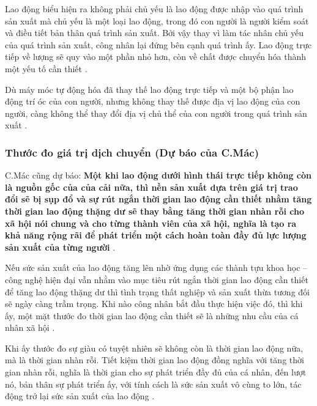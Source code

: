 Lao động biểu hiện ra không phải chủ yếu là lao động được nhập vào quá trình sản xuất mà chủ yếu là một loại lao động, trong đó con người là người kiểm soát và điều tiết bản thân quá trình sản xuất. Bởi vậy thay vì làm tác nhân chủ yếu của quá trình sản xuất, công nhân lại đứng bên cạnh quá trình ấy. Lao động trực tiếp về lượng sẽ quy vào một phần nhỏ hơn, còn về chất được chuyển hóa thành một yếu tố cần thiết \cite{do_the_tung_gttd, marx_toantp_t46p2}.

Dù máy móc tự động hóa đã thay thế lao động trực tiếp và một bộ phận lao động trí óc của con người, nhưng không thay thế được địa vị lao động của con người, càng không thể thay đổi địa vị chủ thể của con người trong quá trình sản xuất \cite{tran_hieu_gttd}.

\subsubsection{Thước đo giá trị dịch chuyển (Dự báo của C.Mác)}

C.Mác cũng dự báo: \textbf{Một khi lao động dưới hình thái trực tiếp không còn là nguồn gốc của của cải nữa, thì nền sản xuất dựa trên giá trị trao đổi sẽ bị sụp đổ và sự rút ngắn thời gian lao động cần thiết nhằm tăng thời gian lao động thặng dư sẽ thay bằng tăng thời gian nhàn rỗi cho xã hội nói chung và cho từng thành viên của xã hội, nghĩa là tạo ra khả năng rộng rãi để phát triển một cách hoàn toàn đầy đủ lực lượng sản xuất của từng người} \cite{do_the_tung_gttd, marx_toantp_t46p2_b}.

Nếu sức sản xuất của lao động tăng lên nhờ ứng dụng các thành tựu khoa học -- công nghệ hiện đại vẫn nhằm vào mục tiêu rút ngắn thời gian lao động cần thiết để tăng lao động thặng dư thì tình trạng thất nghiệp và sản xuất thừa tương đối sẽ ngày càng trầm trọng. Khi nào công nhân bắt đầu thực hiện việc đó, thì khi ấy, một mặt thước đo thời gian lao động cần thiết sẽ là những nhu cầu của cá nhân xã hội \cite{do_the_tung_gttd, marx_toantp_t46p2_b}.

Khi ấy thước đo sự giàu có tuyệt nhiên sẽ không còn là thời gian lao động nữa, mà là thời gian nhàn rỗi. Tiết kiệm thời gian lao động đồng nghĩa với tăng thời gian nhàn rỗi, nghĩa là thời gian cho sự phát triển đầy đủ của cá nhân, đến lượt nó, bản thân sự phát triển ấy, với tính cách là sức sản xuất vô cùng to lớn, tác động trở lại sức sản xuất của lao động \cite{do_the_tung_gttd, marx_toantp_t46p2_b}.
